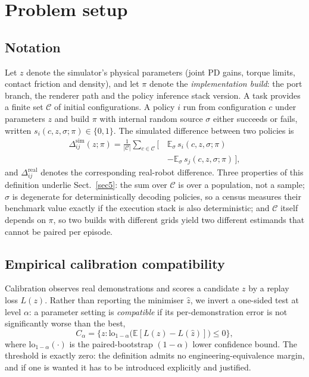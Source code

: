 \documentclass[pdflatex,iicol,sn-apa]{sn-jnl}
\theoremstyle{remark}
\begin{document}
\section{Problem setup}\label{sec3}

\subsection{Notation}\label{subsec3_1}

Let $z$ denote the simulator's physical parameters (joint PD gains, torque limits, contact friction
and density), and let $\pi$ denote the \emph{implementation build}: the port branch, the renderer
path and the policy inference stack version. A task provides a finite set $\mathcal{C}$ of initial
configurations. A policy $i$ run from configuration $c$ under parameters $z$ and build $\pi$ with
internal random source $\sigma$ either succeeds or fails, written
$s_i(c, z, \sigma; \pi) \in \{0,1\}$. The simulated difference between two policies is
\begin{equation}\label{eq:delta}
\begin{split}
\Delta^{\mathrm{sim}}_{ij}(z; \pi) = \frac{1}{|\mathcal{C}|} \sum_{c \in \mathcal{C}}
\big[ \, &\mathbb{E}_\sigma\, s_i(c, z, \sigma; \pi) \\[-2pt]
         &- \mathbb{E}_\sigma\, s_j(c, z, \sigma; \pi) \, \big],
\end{split}
\end{equation}
and $\Delta^{\mathrm{real}}_{ij}$ denotes the corresponding real-robot difference. Three properties
of this definition underlie Sect.~\ref{sec5}: the sum over $\mathcal{C}$ is over a population,
not a sample; $\sigma$ is degenerate for deterministically decoding policies, so a census measures
their benchmark value exactly if the execution stack is also deterministic; and
$\mathcal{C}$ itself depends on $\pi$, so two builds with different grids yield two
different estimands that cannot be paired per episode.

\subsection{Empirical calibration compatibility}\label{subsec3_2}

Calibration observes real demonstrations and scores a candidate $z$ by a replay loss $L(z)$. Rather
than reporting the minimiser $\hat z$, we invert a one-sided test at level $\alpha$: a parameter
setting is \emph{compatible} if its per-demonstration error is not significantly worse than the
best,
\begin{equation}\label{eq:cset}
C_\alpha = \Big\{ z : \mathrm{lo}_{1-\alpha}\big( \mathbb{E}[L(z) - L(\hat z)] \big) \le 0 \Big\},
\end{equation}
where $\mathrm{lo}_{1-\alpha}(\cdot)$ is the paired-bootstrap $(1-\alpha)$ lower confidence bound.
The threshold is exactly zero: the definition admits no engineering-equivalence margin, and if one
is wanted it has to be introduced explicitly and justified.
\end{document}

